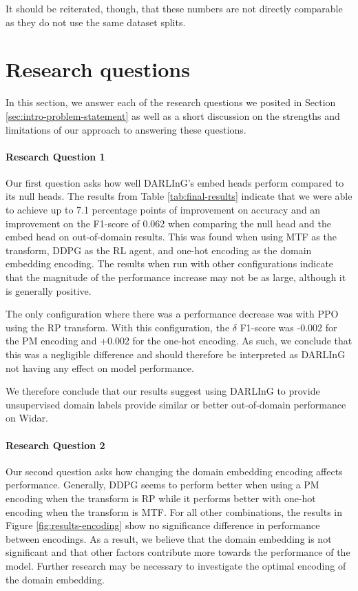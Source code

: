 It should be reiterated, though, that these numbers are not directly comparable as they do not use the same dataset splits.

\section{Research questions}

In this section, we answer each of the research questions we posited in Section \ref{sec:intro-problem-statement} as well as a short discussion on the strengths and limitations of our approach to answering these questions.

\paragraph{Research Question 1}
Our first question asks how well DARLInG's embed heads perform compared to its null heads.
The results from Table \ref{tab:final-results} indicate that we were able to achieve up to 7.1 percentage points of improvement on accuracy and an improvement on the F1-score of 0.062 when comparing the null head and the embed head on out-of-domain results.
This was found when using MTF as the transform, DDPG as the RL agent, and one-hot encoding as the domain embedding encoding.
The results when run with other configurations indicate that the magnitude of the performance increase may not be as large, although it is generally positive.

The only configuration where there was a performance decrease was with PPO using the RP transform.
With this configuration, the $\delta$ F1-score was -0.002 for the PM encoding and +0.002 for the one-hot encoding.
As such, we conclude that this was a negligible difference and should therefore be interpreted as DARLInG not having any effect on model performance.

We therefore conclude that our results suggest using DARLInG to provide unsupervised domain labels provide similar or better out-of-domain performance on Widar.

\paragraph{Research Question 2}
Our second question asks how changing the domain embedding encoding affects performance.
Generally, DDPG seems to perform better when using a PM encoding when the transform is RP while it performs better with one-hot encoding when the transform is MTF.
For all other combinations, the results in Figure \ref{fig:results-encoding} show no significance difference in performance between encodings.
As a result, we believe that the domain embedding is not significant and that other factors contribute more towards the performance of the model.
Further research may be necessary to investigate the optimal encoding of the domain embedding.

